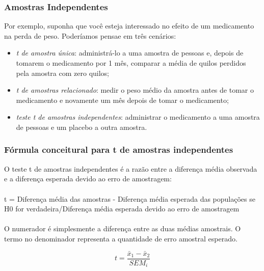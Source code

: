 \documentclass[11pt]{beamer}
\begin{document}
\begin{frame}
\frametitle{Amostras Independentes}
Por exemplo, suponha que você esteja interessado no efeito de um medicamento na perda de peso. Poderíamos pensae em três cenários:
\begin{itemize}
\item \textit{t de amostra única}: administrá-lo a uma amostra de pessoas e, depois de tomarem o medicamento por 1 mês, comparar a média de quilos perdidos pela amostra com zero quilos;
\item \textit{t de amostras relacionado}: medir o peso médio da amostra antes de tomar o medicamento e novamente um mês depois de tomar o medicamento;
\item \textit{teste t de amostras independentes}: administrar o medicamento a uma amostra de pessoas e um placebo a outra amostra.
\end{itemize}
\end{frame}

\begin{frame}
\frametitle{Fórmula conceitural para t de amostras independentes}
O teste t de amostras independentes é a razão entre a diferença média observada e a diferença esperada devido ao erro de amostragem:\\~\\

t = Diferença média das amostras - Diferença média esperada das populações se H0 for verdadeira/Diferença média esperada devido ao erro de amostragem\\~\\

O numerador é simplesmente a diferença entre as duas médias amostrais. O termo no denominador representa a quantidade de erro amostral esperado.

\[t = \frac{\bar{x}_1-\bar{x}_2}{SEM_i}\]

\end{frame}
\end{document}
